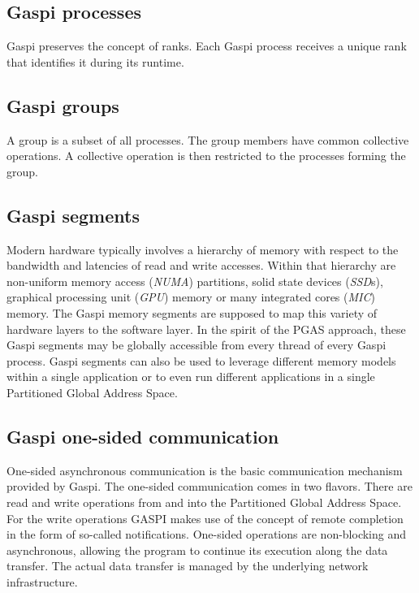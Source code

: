 \documentclass[a4paper]{article}
\newlength{\st}\setlength{\st}{0pt}
\newcommand{\GASPI}{{\sc Gaspi}}
\begin{document}
\subsection{\GASPI{} processes}


\GASPI{} preserves the concept of ranks. Each \GASPI{} process receives
a unique rank that identifies it during its runtime.

\subsection{\GASPI{} groups}

A group is a subset of all processes. The group members
have common collective operations. A collective operation is then
restricted to the processes forming the group.

\subsection{\GASPI{} segments}

Modern hardware typically involves a hierarchy of memory with respect
to the bandwidth and latencies of read and write accesses. Within that
hierarchy are non-uniform memory access (\emph{NUMA}) partitions,
solid state devices (\emph{SSD}s), graphical processing unit
(\emph{GPU}) memory or many integrated cores (\emph{MIC}) memory.  The
\GASPI{} memory segments are supposed to map this variety of hardware
layers to the software layer. In the spirit of the PGAS approach,
these \GASPI{} segments may be globally accessible from every thread
of every \GASPI{} process.  \GASPI{} segments can also be used to
leverage different memory models within a single application or to
even run different applications in a single Partitioned Global Address
Space.

\subsection{\GASPI{} one-sided communication}

One-sided asynchronous communication is the basic communication
mechanism provided by \GASPI{}. The one-sided communication comes in
two flavors.  There are read and write operations from and into the
Partitioned Global Address Space. For the write operations GASPI makes
use of the concept of remote completion in the form of so-called
notifications.  One-sided operations are non-blocking and
asynchronous, allowing the program to continue its execution along the
data transfer. The actual data transfer is managed by the underlying
network infrastructure.
\end{document}
